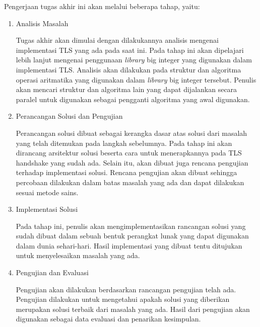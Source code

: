 Pengerjaan tugas akhir ini akan melalui beberapa tahap, yaitu:
\begin{enumerate}
  \item Analisis Masalah


  Tugas akhir akan dimulai dengan dilakukannya analisis mengenai implementasi TLS yang ada pada saat ini. Pada tahap ini akan dipelajari lebih lanjut mengenai penggunaan \textit{library} big integer yang digunakan dalam implementasi TLS. Analisis akan dilakukan pada struktur dan algoritma operasi aritmatika yang digunakan dalam \textit{library} big integer tersebut. Penulis akan mencari struktur dan algoritma lain yang dapat dijalankan secara paralel untuk  digunakan sebagai pengganti algoritma yang awal digunakan.

  \item Perancangan Solusi dan Pengujian

  Perancangan solusi dibuat sebagai kerangka dasar atas solusi dari masalah yang telah ditemukan pada langkah sebelumnya. Pada tahap ini akan dirancang arsitektur solusi beserta cara untuk menerapkannya pada TLS handshake yang sudah ada. Selain itu, akan dibuat juga rencana pengujian terhadap implementasi solusi. Rencana pengujian akan dibuat sehingga percobaan dilakukan dalam batas masalah yang ada dan dapat dilakukan sesuai metode sains.

  \item Implementasi Solusi

  Pada tahap ini, penulis akan mengimplementasikan rancangan solusi yang sudah dibuat dalam sebuah bentuk perangkat lunak yang dapat digunakan dalam dunia sehari-hari. Hasil implementasi yang dibuat tentu ditujukan untuk menyelesaikan masalah yang ada.

  \item Pengujian dan Evaluasi

  Pengujian akan dilakukan berdasarkan rancangan pengujian telah ada. Pengujian dilakukan untuk mengetahui apakah solusi yang diberikan merupakan solusi terbaik dari masalah yang ada. Hasil dari pengujian akan digunakan sebagai data evaluasi dan penarikan kesimpulan.

\end{enumerate}


